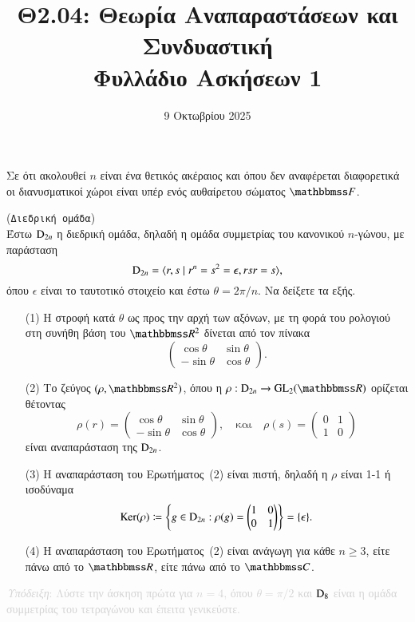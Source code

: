 \documentclass[12pt,a4paper,reqno]{amsart}
\title[]{Θ2.04: Θεωρία Αναπαραστάσεων και Συνδυαστική \\ Φυλλάδιο Ασκήσεων 1}
\date{9 Οκτωβρίου 2025}
\begin{document}
\begingroup
\def\uppercasenonmath#1{} %
\let\MakeUppercase\relax %
\maketitle
\endgroup

\setcounter{section}{1}
\thispagestyle{empty}

Σε ότι ακολουθεί $n$ είναι ένα θετικός ακέραιος και όπου δεν αναφέρεται διαφορετικά οι διανυσματικοί χώροι είναι υπέρ ενός αυθαίρετου σώματος $\FF$.

\begin{exercise}{(\texttt{Διεδρική ομάδα})}
    \\
    Έστω $\mathrm{D}_{2n}$ η διεδρική ομάδα, δηλαδή η ομάδα συμμετρίας του κανονικού $n$-γώνου, με παράσταση 
    \[
    \mathrm{D}_{2n} = \langle r, s \mid r^n = s^2 = \epsilon, rsr = s\rangle,
    \]
    όπου $\epsilon$ είναι το ταυτοτικό στοιχείο και έστω $\theta = 2\pi/n$. Να δείξετε τα εξής.
    \begin{itemize}
        \item[(1)] Η στροφή κατά $\theta$ ως προς την αρχή των αξόνων, με τη φορά του ρολογιού στη συνήθη βάση του $\RR^2$ δίνεται από τον πίνακα 
        \[
        \begin{pmatrix}
            \cos\theta  & \sin\theta \\
            -\sin\theta & \cos\theta
        \end{pmatrix}.
        \]
        \item[(2)] Το ζεύγος $(\rho, \RR^2)$, όπου η $\rho : \rmD_{2n} \to \GL_2(\RR)$ ορίζεται θέτοντας
        \[
        \rho(r) = 
        \begin{pmatrix}
            \cos\theta  & \sin\theta \\
            -\sin\theta & \cos\theta
        \end{pmatrix},
        \quad 
        \text{και}
        \quad 
        \rho(s) = 
        \begin{pmatrix}
            0 & 1 \\
            1 & 0
        \end{pmatrix}
        \]
        είναι αναπαράσταση της $\mathrm{D}_{2n}$.
        \item[(3)] Η αναπαράσταση του Ερωτήματος~(2) είναι πιστή, δηλαδή η $\rho$ είναι 1-1 ή ισοδύναμα 
        \[ 
        \mathrm{Ker}(\rho) \coloneqq \left\{g \in \mathrm{D}_{2n} : \rho(g) = 
        \begin{pmatrix}
            1 & 0 \\ 0 & 1 
        \end{pmatrix}\right\} 
        = \{\epsilon\}.
        \]
        \item[(4)] Η αναπαράσταση του Ερωτήματος~(2) είναι ανάγωγη για κάθε $n \ge 3$, είτε πάνω από το $\RR$, είτε πάνω από το $\CC$.
    \end{itemize}

\textcolor{lightgray}{\small{\emph{Υπόδειξη}: Λύστε την άσκηση πρώτα για $n=4$, όπου $\theta = \pi/2$ και $\mathrm{D}_8$ είναι η ομάδα συμμετρίας του τετραγώνου και έπειτα γενικεύστε.}}
\end{exercise}
\end{document}
